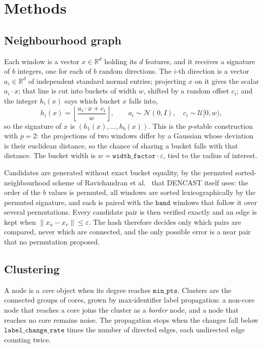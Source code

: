 \documentclass{article}
\begin{document}
\section{Methods}

\subsection{Neighbourhood graph}

Each window is a vector $x\in\mathbb{R}^{d}$ holding its $d$ features, and it receives a signature of $b$ integers, one for each of $b$ random directions. The $i$-th direction is a vector $a_i\in\mathbb{R}^{d}$ of independent standard normal entries; projecting $x$ on it gives the scalar $a_i\cdot x$; that line is cut into buckets of width $w$, shifted by a random offset $c_i$; and the integer $h_i(x)$ says which bucket $x$ falls into,
\begin{equation}
h_i(x) = \left\lfloor \frac{a_i \cdot x + c_i}{w} \right\rfloor ,
\qquad a_i \sim \mathcal{N}(0, I), \quad c_i \sim \mathcal{U}[0, w),
\end{equation}
so the signature of $x$ is $(h_1(x),\dots,h_b(x))$. 
This is the $p$-stable construction with $p=2$: the projections of two windows differ by a Gaussian whose deviation 
is their euclidean distance, so the chance of sharing a bucket falls with that distance. The bucket width is 
$w = \texttt{width\_factor} \cdot \varepsilon$, tied to the radius of interest.


Candidates are generated without exact bucket equality, by the permuted sorted-neighbourhood
scheme of Ravichandran et al.~\cite{ravichandran2005lsh} that DENCAST itself uses: the order
of the $b$ values is permuted, all windows are sorted lexicographically by the permuted
signature, and each is paired with the $\texttt{band}$ windows that follow it over several
permutations. Every
candidate pair is then verified exactly and an edge is kept when
$\lVert x_u - x_v \rVert \le \varepsilon$. The hash therefore decides only which pairs are
compared, never which are connected, and the only possible error is a near pair that no
permutation proposed.

\subsection{Clustering}

A node is a \emph{core} object when its degree reaches $\texttt{min\_pts}$. 
Clusters are the connected groups of cores, grown by max-identifier label propagation: 
a non-core node that reaches a core joins the cluster as a \emph{border} node, and a node that reaches no core remains noise.
The propagation stops when the changes fall below $\texttt{label\_change\_rate}$ times the number of directed edges, each undirected edge counting twice.
\end{document}
